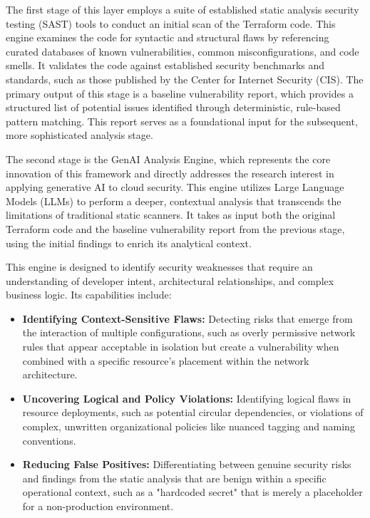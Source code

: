 The first stage of this layer employs a suite of established static analysis security testing (SAST) tools to conduct an initial scan of the Terraform code. This engine examines the code for syntactic and structural flaws by referencing curated databases of known vulnerabilities, common misconfigurations, and code smells. It validates the code against established security benchmarks and standards, such as those published by the Center for Internet Security (CIS). The primary output of this stage is a baseline vulnerability report, which provides a structured list of potential issues identified through deterministic, rule-based pattern matching. This report serves as a foundational input for the subsequent, more sophisticated analysis stage.

The second stage is the GenAI Analysis Engine, which represents the core innovation of this framework and directly addresses the research interest in applying generative AI to cloud security. This engine utilizes Large Language Models (LLMs) to perform a deeper, contextual analysis that transcends the limitations of traditional static scanners\cite{hayagreevan_security_2024, ling_enhancing_2024}. It takes as input both the original Terraform code and the baseline vulnerability report from the previous stage, using the initial findings to enrich its analytical context.


This engine is designed to identify security weaknesses that require an understanding of developer intent, architectural relationships, and complex business logic\cite{noseevich_towards_2015}. Its capabilities include:

\begin{itemize}
    \item \textbf{Identifying Context-Sensitive Flaws:} Detecting risks that emerge from the interaction of multiple configurations, such as overly permissive network rules that appear acceptable in isolation but create a vulnerability when combined with a specific resource's placement within the network architecture\cite{noseevich_towards_2015}.
    \item \textbf{Uncovering Logical and Policy Violations:} Identifying logical flaws in resource deployments, such as potential circular dependencies, or violations of complex, unwritten organizational policies like nuanced tagging and naming conventions.
    \item \textbf{Reducing False Positives:} Differentiating between genuine security risks and findings from the static analysis that are benign within a specific operational context, such as a "hardcoded secret" that is merely a placeholder for a non-production environment.
\end{itemize}

